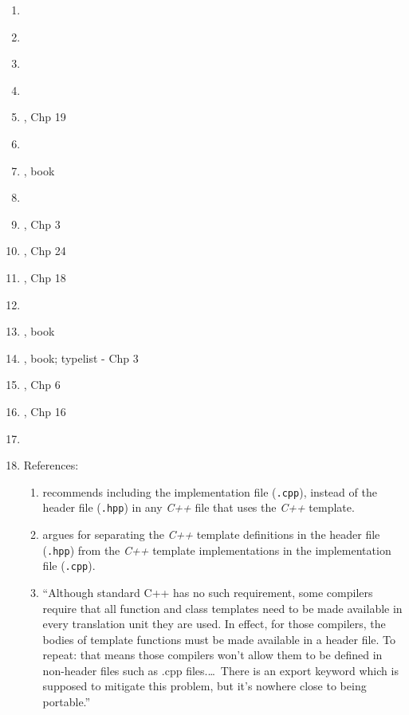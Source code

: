 \begin{enumerate}
\begin{enumerate}
	\item \cite[\S16.2--\S16.4]{Gaddis2012}
	\item \cite[pp. 13, 26--27, 33--34, 36, 62, 68, 1024]{Josuttis2012}
	\item \cite[\S16.2--\S16.4]{Gaddis2011}
	\item \cite[Chp. 17]{Savitch2009}
	\item \cite{Stroustrup2009}, Chp 19
	\item \cite[\S6.16, pp. 193--195]{Pozrikidis2007}
	\item \cite{Abrahams2005}, book
	\item \cite[pp. --]{Prata2005}
	\item \cite{Eckel2003}, Chp 3
	\item \cite{Oualline2003}, Chp 24
	\item \cite{Schildt2003}, Chp 18
	\item \cite[Chp. 16, pp. 375--394]{Schildt2003a}
	\item \cite{Vandevoorde2003}, book
	\item \cite{Alexandrescu2001}, book; typelist - Chp 3
	\item \cite{Vermeir2001}, Chp 6
	\item \cite{Eckel2000}, Chp 16
	\item \cite[Chp. 18, pp. 461--487]{Schildt1998a}
	\item References: \vspace{-0.2cm}
		\begin{enumerate} \itemsep -2pt
		\item \cite{Moses2016} recommends including the implementation file ({\tt .cpp}), instead of the header file ({\tt .hpp}) in any {\it C++} file that uses the {\it C++} template.
		\item \cite{Ben2013} argues for separating the {\it C++} template definitions in the header file ({\tt .hpp}) from the {\it C++} template implementations in the implementation file ({\tt .cpp}).
		\item ``Although standard C++ has no such requirement, some compilers require that all function and class templates need to be made available in every translation unit they are used. In effect, for those compilers, the bodies of template functions must be made available in a header file. To repeat: that means those compilers won't allow them to be defined in non-header files such as .cpp files.\dots\ There is an export keyword which is supposed to mitigate this problem, but it's nowhere close to being portable.'' \cite{Gogolev2009}

\end{enumerate}
\end{enumerate}
\end{enumerate}
